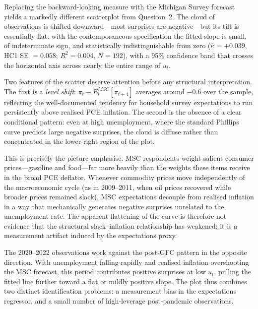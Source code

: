 \documentclass[dvipsnames,11pt]{article}
\begin{document}
\begin{enumerate}[resume]
\begin{solution}
                    Replacing the backward-looking measure with the Michigan Survey forecast yields a markedly different scatterplot from Question~2. The cloud of observations is shifted downward---most surprises are negative---but its tilt is essentially flat: with the contemporaneous specification the fitted slope is small, of indeterminate sign, and statistically indistinguishable from zero ($\hat{\kappa}=+0.039$, HC1 SE $=0.058$; $R^2=0.004$, $N=192$), with a 95\% confidence band that crosses the horizontal axis across nearly the entire range of $u_t$.

                    Two features of the scatter deserve attention before any structural interpretation. The first is a \emph{level shift}: $\pi_t - E_t^{MSC}[\pi_{t+4}]$ averages around $-0.6$ over the sample, reflecting the well-documented tendency for household survey expectations to run persistently above realised PCE inflation. The second is the absence of a clear conditional pattern: even at high unemployment, where the standard Phillips curve predicts large negative surprises, the cloud is diffuse rather than concentrated in the lower-right region of the plot.

                    This is precisely the picture \textcite{coibion2015phillips} emphasise. MSC respondents weight salient consumer prices---gasoline and food---far more heavily than the weights these items receive in the broad PCE deflator. Whenever commodity prices move independently of the macroeconomic cycle (as in 2009--2011, when oil prices recovered while broader prices remained slack), MSC expectations decouple from realised inflation in a way that mechanically generates negative surprises unrelated to the unemployment rate. The apparent flattening of the curve is therefore not evidence that the structural slack--inflation relationship has weakened; it is a measurement artifact induced by the expectations proxy.

                    The 2020--2022 observations work against the post-GFC pattern in the opposite direction. With unemployment falling rapidly and realised inflation overshooting the MSC forecast, this period contributes positive surprises at low $u_t$, pulling the fitted line further toward a flat or mildly positive slope. The plot thus combines two distinct identification problems: a measurement bias in the expectations regressor, and a small number of high-leverage post-pandemic observations.


\end{solution}
\end{enumerate}
\end{document}
